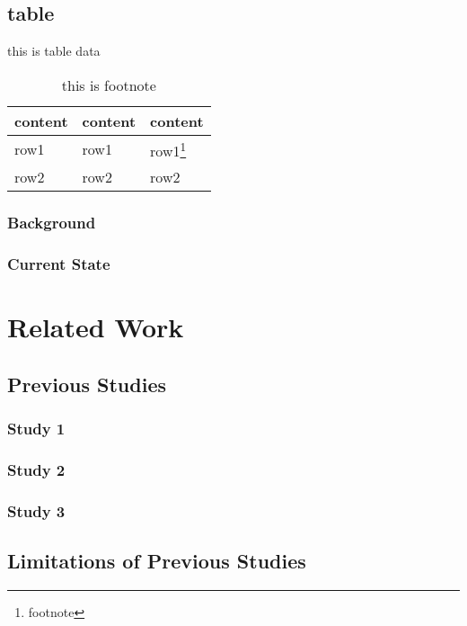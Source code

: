 \documentclass[writingLanguage=english, %
    addPageTitle=on,  %
    addDeclaration=on, %
    addMUSTlogo=on, %
    addFigTOC=on, %
    addTabTOC=on, %
    refIndent=off, %
    printMod=off, %
]{.def/must}
\begin{document}
\section{table}

\captionsetup[table]{singlelinecheck=off,justification=raggedright}
\begin{table}
\caption{this is table data}
\centering
\begin{tabularx}{\textwidth}{XXX} %
\toprule
content & content & content \\
\midrule
row1 & row1 & row1\footnote{footnote} \\
row2 & row2 & row2 \\
\bottomrule
\end{tabularx}
\caption*{this is footnote}
\end{table}




\subsection{Background}



\subsection{Current State}

\chapter{Related Work}
\section{Previous Studies}
\subsection{Study 1}
\subsection{Study 2}
\subsection{Study 3}
\section{Limitations of Previous Studies}
\end{document}
